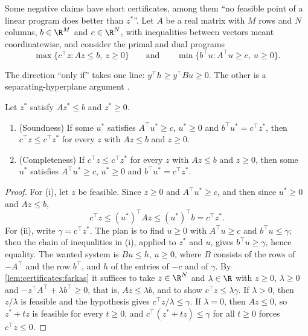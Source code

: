 \begin{refsection}
Some negative claims have short certificates, among them ``no feasible point of a linear program does better than $z^*$''. Let $A$ be a real matrix with $M$ rows and $N$ columns, $b\in\R^M$ and $c\in\R^N$, with inequalities between vectors meant coordinatewise, and consider the primal and dual programs
\[
  \max\{c^\top z: Az\le b,\ z\ge0\}\qquad\text{and}\qquad\min\{b^\top u: A^\top u\ge c,\ u\ge0\}.
\]


The direction ``only if'' takes one line: $y^\top h\ge y^\top Bu\ge0$. The other is a separating-hyperplane argument \parencite{MatousekGartner2007}.

\begin{theorem}\label{thm:certificates:lp}
Let $z^*$ satisfy $Az^*\le b$ and $z^*\ge0$.
\begin{enumerate}
\item (Soundness) If some $u^*$ satisfies $A^\top u^*\ge c$, $u^*\ge0$ and $b^\top u^*=c^\top z^*$, then $c^\top z\le c^\top z^*$ for every $z$ with $Az\le b$ and $z\ge0$.
\item (Completeness) If $c^\top z\le c^\top z^*$ for every $z$ with $Az\le b$ and $z\ge0$, then some $u^*$ satisfies $A^\top u^*\ge c$, $u^*\ge0$ and $b^\top u^*=c^\top z^*$.
\end{enumerate}
\end{theorem}

\begin{proof}
For (i), let $z$ be feasible. Since $z\ge0$ and $A^\top u^*\ge c$, and then since $u^*\ge0$ and $Az\le b$,
\[
  c^\top z\le(u^*)^\top Az\le(u^*)^\top b=c^\top z^*.
\]
For (ii), write $\gamma=c^\top z^*$. The plan is to find $u\ge0$ with $A^\top u\ge c$ and $b^\top u\le\gamma$; then the chain of inequalities in (i), applied to $z^*$ and $u$, gives $b^\top u\ge\gamma$, hence equality. The wanted system is $Bu\le h$, $u\ge0$, where $B$ consists of the rows of $-A^\top$ and the row $b^\top$, and $h$ of the entries of $-c$ and of $\gamma$. By \cref{lem:certificates:farkas} it suffices to take $z\in\R^N$ and $\lambda\in\R$ with $z\ge0$, $\lambda\ge0$ and $-z^\top A^\top+\lambda b^\top\ge0$, that is, $Az\le\lambda b$, and to show $c^\top z\le\lambda\gamma$. If $\lambda>0$, then $z/\lambda$ is feasible and the hypothesis gives $c^\top z/\lambda\le\gamma$. If $\lambda=0$, then $Az\le0$, so $z^*+tz$ is feasible for every $t\ge0$, and $c^\top(z^*+tz)\le\gamma$ for all $t\ge0$ forces $c^\top z\le0$.
\end{proof}


\end{refsection}
